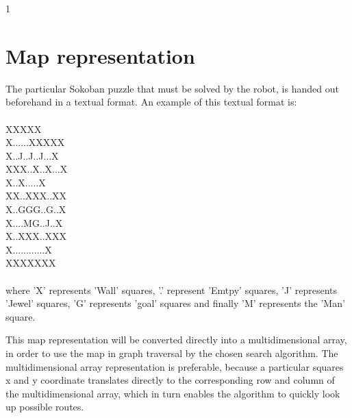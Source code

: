 1\section{Map representation}
The particular Sokoban puzzle that must be solved by the robot, is handed out beforehand in a textual format. An example of this textual format is:
\\\\
XXXXX\\  
X......XXXXX\\ 
X..J..J..J...X\\  
XXX..X..X...X\\   
\hspace*{6 mm}X..X.....X\\  
\hspace*{3 mm}XX..XXX..XX\\        
\hspace*{3 mm}X..GGG..G..X\\ 
\hspace*{3 mm}X....MG..J..X\\  
\hspace*{3 mm}X..XXX..XXX\\     
\hspace*{3 mm}X............X\\
\hspace*{3 mm}XXXXXXX  
\\\\ 
where 'X' represents 'Wall' squares, '.' represent 'Emtpy' squares, 'J' represents 'Jewel' squares, 'G' represents 'goal' squares and finally 'M' represents the 'Man' square. 

This map representation will be converted directly into a multidimensional array, in order to use the map in graph traversal by the chosen search algorithm. The multidimensional array representation is preferable, because a particular squares x and y coordinate translates directly to the corresponding row and column of the multidimensional array, which in turn enables the algorithm to quickly look up possible routes.